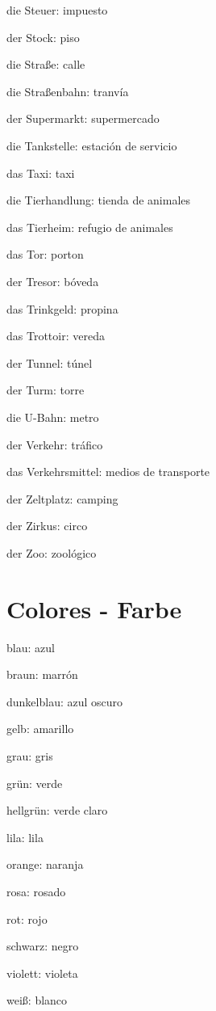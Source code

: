 \begin{multicols}{2}
\begin{myitemize}
\item die Steuer: impuesto
\item der Stock: piso
\item die Straße: calle
\item die Straßenbahn: tranvía
\item der Supermarkt: supermercado
\item die Tankstelle: estación de servicio
\item das Taxi: taxi
\item die Tierhandlung: tienda de animales
\item das Tierheim: refugio de animales
\item das Tor: porton
\item der Tresor: bóveda
\item das Trinkgeld: propina
\item das Trottoir: vereda
\item der Tunnel: túnel
\item der Turm: torre
\item die U-Bahn: metro
\item der Verkehr: tráfico
\item das Verkehrsmittel: medios de transporte
\item der Zeltplatz: camping
\item der Zirkus: circo
\item der Zoo: zoológico
\end{myitemize}
\end{multicols}


\section{Colores - Farbe}
\begin{multicols}{3}
\begin{myitemize}
\item blau: azul
\item braun: marrón
\item dunkelblau: azul oscuro
\item gelb: amarillo
\item grau: gris
\item grün: verde
\item hellgrün: verde claro
\item lila: lila
\item orange: naranja
\item rosa: rosado
\item rot: rojo
\item schwarz: negro
\item violett: violeta
\item weiß: blanco
\end{myitemize}
\end{multicols}

